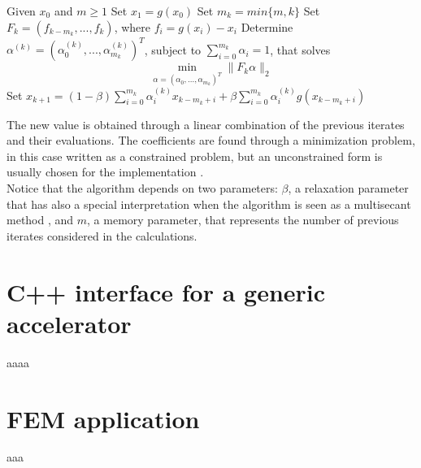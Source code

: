 \documentclass[12pt]{article}
\begin{document}
				
				\begin{algorithmic}
					\State Given $x_0$ and $m \geq 1$
					\State Set $x_1 = g(x_0)$
					\State Set $m_k = min\{m, k\}$
					\State Set $F_k = (f_{k-m_k}, ... , f_k)$, where $f_i = g(x_i)-x_{i}$
					\State Determine $\alpha^{(k)} = (\alpha^{(k)}_0 , ..., \alpha^{(k)}_{m_k} )^T$, subject to 
					$\sum^{m_k}_{i=0} {\alpha_i = 1}$, that solves
					$$\min_{\alpha=(\alpha_0,...,\alpha_{m_k} )^T} \|F_k \alpha\|_2$$
					\State Set $x_{k+1} = (1-\beta) \sum^{m_k}_{i=0} {\alpha_i^{(k)} x_{k-m_{k}+i}}	+\beta \sum^{m_k}_{i=0} {\alpha_i^{(k)} g(x_{k-m_{k}+i})}$   
					\EndFor
				\end{algorithmic}
				
			The new value is obtained through a linear combination of the previous iterates and their evaluations.
			The coefficients are found through a minimization problem, in this case written as a constrained
			problem, but an unconstrained form is usually chosen for the implementation \cite{Fang}\cite{Walker}.\\
			Notice that the algorithm depends on two parameters: $\beta$, a relaxation parameter that has also
			a special interpretation when the algorithm is seen as a multisecant method \cite{Fang}, and $m$,
			a memory parameter, that represents the number of previous iterates considered in the calculations.
			
				
				
		\section{C++ interface for a generic accelerator}
		\label{sec:C++}
			aaaa
		\section{FEM application}
		\label{sec:FEM}
			aaa

						
			\printbibliography[heading=bibintoc,
			title={Bibliography}]
						
					
	
\end{document}
